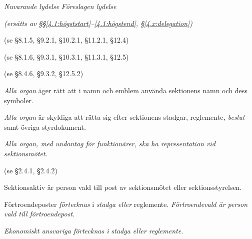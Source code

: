 \documentclass{article}
\newenvironment{lydelse}
    {\begin{paracol}{2}%
        \emph{Nuvarande lydelse}%
        \switchcolumn%
        \emph{Föreslagen lydelse}%
    \end{paracol}%
    \begin{enumerate}[label=\thesubsection.\arabic*]%
    \begin{paracol}{2}%
    }{\end{paracol}\end{enumerate}}
\begin{document}
\begin{lydelse}
	\switchcolumn
	  \emph{(ersätts av \S\S \ref{4.1:högststart}--\ref{4.1:högstend}, \S\ref{4.x:delegation})}
    
	\switchcolumn*
    \item[] (se \S 8.1.5, \S 9.2.1, \S 10.2.1, \S 11.2.1, \S 12.4)
  
    \item[] (se \S 8.1.6, \S 9.3.1, \S 10.3.1, \S 11.3.1, \S 12.5)

    \item[] (se \S 8.4.6, \S 9.3.2, \S 12.5.2)

  \switchcolumn
    \item \emph{Alla organ} äger rätt att i namn och emblem använda sektionens namn och dess symboler.
      \label{4.1:emblem}

    \item \emph{Alla organ} är skyldiga att rätta sig efter sektionens stadgar, reglemente\emph{, beslut} samt övriga styrdokument.
      \label{4.1:rätta}
      
    \item \emph{Alla organ, med undantag för funktionärer, ska ha representation vid sektionsmötet.} \label{4.1:rep}

  \switchcolumn*
      (se \S 2.4.1, \S 2.4.2)
      
  \switchcolumn
    \item Sektionsaktiv är person vald till post av sektionsmötet eller sektionsstyrelsen.
      \label{4.x:aktiv}
      
    \item Förtroendeposter \emph{förtecknas} i \emph{stadga eller} reglemente.
      \emph{Förtroendevald är person vald till förtroendepost.}
      \label{4.x:fortroende}

    \item \emph{Ekonomiskt ansvariga förtecknas i stadga eller reglemente.}

\end{lydelse}
\end{document}
